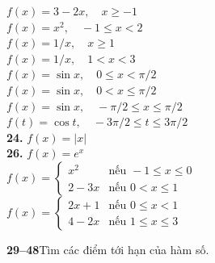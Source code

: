 \begin{minipage}[t]{0.485\textwidth}
\vspace{5pt}
$f(x) = 3 - 2x, \quad x \ge -1$\\[3pt]
$f(x) = x^2, \quad -1 \le x < 2$\\[3pt]
$f(x) = 1/x, \quad x \ge 1$\\[3pt]
$f(x) = 1/x, \quad 1 < x < 3$\\[3pt]
$f(x) = \sin x, \quad 0 \le x < \pi/2$\\[3pt]
$f(x) = \sin x, \quad 0 < x \le \pi/2$\\[3pt]
$f(x) = \sin x, \quad -\pi/2 \le x \le \pi/2$\\[3pt]
$f(t) = \cos t, \quad -3\pi/2 \le t \le 3\pi/2$\\[3pt]
\textbf{24.} $f(x) = |x|$\\[3pt]
\textbf{26.} $f(x) = e^x$\\[3pt]
$f(x) = \begin{cases} x^2 & \text{nếu } -1 \le x \le 0 \\ 2 - 3x & \text{nếu } 0 < x \le 1 \end{cases}$\\[4pt]
$f(x) = \begin{cases} 2x + 1 & \text{nếu } 0 \le x < 1 \\ 4 - 2x & \text{nếu } 1 \le x \le 3 \end{cases}$

\vspace{8pt}
{\color{stewartcyan}\textbf{29--48}}\quad Tìm các điểm tới hạn của hàm số.


\end{minipage}
